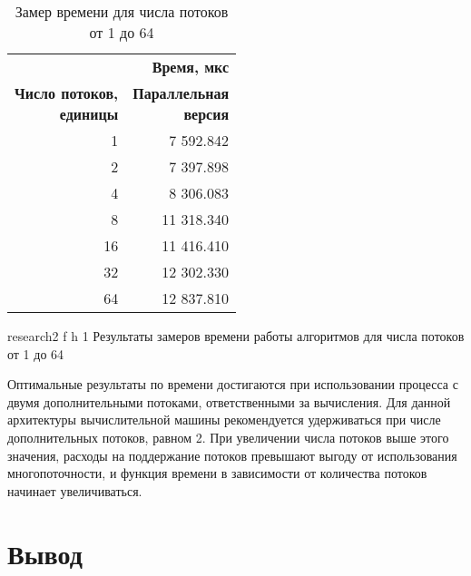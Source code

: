 \begin{table}[ht]
	\small
	\begin{center}
		\begin{threeparttable}
			\caption{Замер времени для числа потоков от 1 до 64}
			\label{tbl:time2}
			\begin{tabular}{|r|r|}
				\hline
				& \bfseries Время, мкс \\ \cline{2-2}
				\bfseries \makecell{Число потоков, \\ единицы} & \bfseries \makecell{Параллельная \\ версия} \\
				\hline
				1 & 7 592.842 \\
				\hline
				2 & 7 397.898 \\
				\hline
				4 & 8 306.083  \\
				\hline
				8 & 11 318.340 \\
				\hline
				16 & 11 416.410 \\
				\hline
				32 & 12 302.330 \\
				\hline
				64 & 12 837.810 \\
				\hline
			\end{tabular}	
		\end{threeparttable}
	\end{center}
\end{table}

\clearpage

{research2} %
{f} %
{h} %
{1\textwidth} %
{Результаты замеров времени работы алгоритмов для числа потоков от 1 до 64} %

Оптимальные результаты по времени достигаются при использовании процесса с двумя дополнительными потоками, ответственными за вычисления. Для данной архитектуры вычислительной машины рекомендуется удерживаться при числе дополнительных потоков, равном 2. При увеличении числа потоков выше этого значения, расходы на поддержание потоков превышают выгоду от использования многопоточности, и функция времени в зависимости от количества потоков начинает увеличиваться.

\clearpage

\section*{Вывод}

